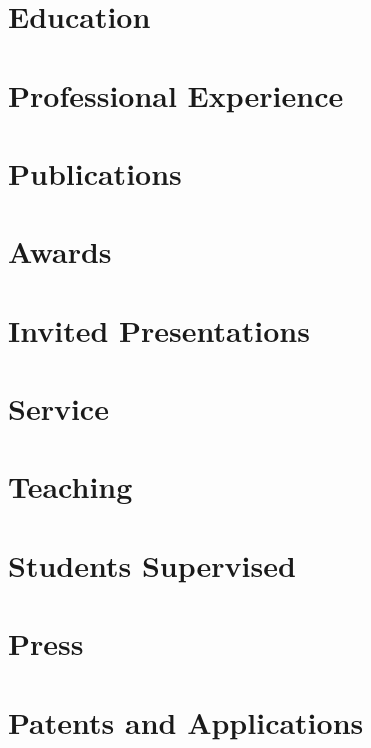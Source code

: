 \documentclass{oneycv}
\affiliation{University of Michigan}
\begin{document}
\makecvtitle
\section{Education}

\section{Professional Experience}

\section{Publications}

\section{Awards}

\section{Invited Presentations}

\section{Service}

\section{Teaching}

\section{Students Supervised}

\section{Press}

\section{Patents and Applications}

\end{document}
